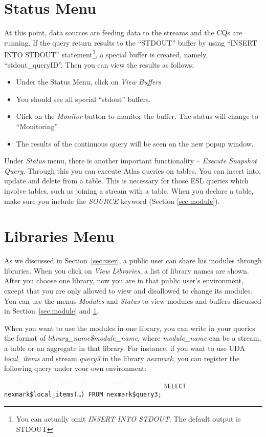 \documentclass[10pt]{article}
\def\cdf{\sf} %
\def\kw#1{\tt #1}
\newenvironment{codedisplay}
{\vspace{-\partopsep}\cdf\addtolength{\baselineskip}{-1pt}
\samepage  \begin{tabbing} \quad
\ \ \ \ \=\ \ \ \ \=\ \ \ \ \=\ \ \ \ \= \ \ \=\ \ \ \
\=\ \ \ \ \=\ \ \ \ \= \ \ \=\ \ \ \ \=\ \ \ \ \=\ \ \ \ \=
\kill}
{\end{tabbing}\vspace{-\partopsep}\vspace{-\topsep}%
}
\begin{document}
\section{Status Menu}
\label{sec:status}
At this point, data sources are feeding data to the streams and the CQs are running.  If the query return results to the ``STDOUT'' buffer by using ``INSERT INTO STDOUT'' statement\footnote{You can actually omit {\em INSERT INTO STDOUT}.  The default output is STDOUT}, a special buffer is created, namely, ``stdout\_queryID''.  Then you can view the results as follows:
\begin{itemize}
  \item Under the Status Menu, click on {\em View Buffers}
  \item You should see all special ``stdout'' buffers.
  \item Click on the {\em Monitor} button to monitor the buffer. The status will change to ``Monitoring''
  \item The results of the continuous query will be seen on the new popup window.
\end{itemize}

Under {\em Status} menu, there is another important functionality -- {\em Execute Snapshot Query}.  Through this you can execute Atlas queries on tables.  You can insert into, update and delete from a table.  This is necessary for those ESL queries which involve tables, such as joining a stream with a table.  When you declare a table, make sure you include the {\em SOURCE} keyword (Section \ref{sec:module}).

\section{Libraries Menu}
\label{sec:lib}
As we discussed in Section~\ref{sec:user}, a public user can share his modules through libraries.  When you click on {\em View Libraries}, a list of library names are shown.  After you choose one library, now you are in that public user's environment, except that you are only allowed to view and disallowed to change its modules.  You can use the menus {\em Modules} and {\em Status} to view modules and buffers discussed in Section~\ref{sec:module} and \ref{sec:status}.

When you want to use the modules in one library, you can write in your queries the format of {\em library\_name\$module\_name}, where {\em module\_name} can be a stream, a table or an aggregate in that library.  For instance, if you want to use UDA {\em local\_items} and stream {\em query3} in the library {\em nexmark}, you can register the following query under your own environment:
\begin{codedisplay}
\kw{SELECT} nexmark\$local\_items(\ldots) \kw{FROM} nexmark\$query3;\\
\end{codedisplay}
\end{document}
